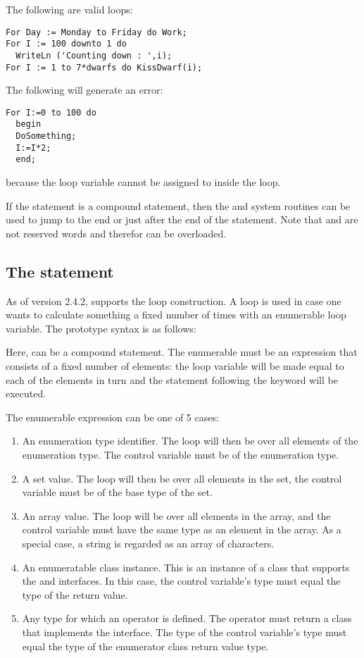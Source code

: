 The following are valid loops:
\begin{verbatim}
For Day := Monday to Friday do Work;
For I := 100 downto 1 do
  WriteLn ('Counting down : ',i);
For I := 1 to 7*dwarfs do KissDwarf(i);
\end{verbatim}
The following will generate an error:
\begin{verbatim}
For I:=0 to 100 do
  begin
  DoSomething;
  I:=I*2;
  end;
\end{verbatim}
because the loop variable  cannot be assigned to inside the loop.

If the statement is a compound statement, then the  and
 system routines can be used to jump to the end or just
after the end of the  statement. Note that  and
 are not reserved words and therefor can be overloaded.

\subsection{The  statement}
As of version 2.4.2, \fpc supports the  loop construction. A
 loop is used in case one wants to calculate something a fixed number of times
with an enumerable loop variable. The prototype syntax is as follows:

Here,  can be a compound statement. The enumerable must be an
expression that consists of a fixed number of elements: the loop variable
will be made equal to each of the elements in turn and the statement following the
 keyword will be executed.

The enumerable expression can be one of 5 cases:
\begin{enumerate}
\item An enumeration type identifier. The loop will then be over all
elements of the enumeration type. The control variable must be of the
enumeration type.
\item A set value. The loop will then be over all elements in the set, the
control variable must be of the base type of the set.
\item An array value. The loop will be over all elements in the array, and
the control variable must have the same type as an element in the array.
As a special case, a string is regarded as an array of characters.
\item An enumeratable class instance. This is an instance of a class that
supports the  and  interfaces. 
In this case, the control variable's type must equal the type of the 
 return value.
\item Any type for which an  operator is defined. The
 operator must return a class that implements the
 interface. The type of the control variable's type 
must equal the type of the enumerator class  return 
value type.
\end{enumerate}


